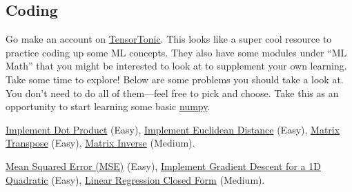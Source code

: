 \documentclass{article}
\newenvironment{envsection}[1]{\begin{trivlist}
\item[\hskip \labelsep {\bfseries #1}]}{\end{trivlist}}
\begin{document}
\subsection*{Coding}

Go make an account on \href{https://www.tensortonic.com/problems}{TensorTonic}. This looks like a super cool resource to practice coding up some ML concepts. They also have some modules under ``ML Math'' that you might be interested to look at to supplement your own learning. Take some time to explore! Below are some problems you should take a look at. You don't need to do all of them---feel free to pick and choose. Take this as an opportunity to start learning some basic \href{https://numpy.org/doc/stable/}{numpy}.

\begin{envsection}{1. Linear Algebra.}
    \href{https://www.tensortonic.com/problems/dot-product}{Implement Dot Product} (Easy), \href{https://www.tensortonic.com/problems/euclidean-distance}{Implement Euclidean Distance} (Easy), \href{https://www.tensortonic.com/problems/matrix-transpose}{Matrix Transpose} (Easy), \href{https://www.tensortonic.com/problems/matrix-inverse}{Matrix Inverse} (Medium).
\end{envsection}

\begin{envsection}{2. Basic ML.}
    \href{https://www.tensortonic.com/problems/mean-squared-error}{Mean Squared Error (MSE)} (Easy), \href{https://www.tensortonic.com/problems/gradient-descent-quadratic}{Implement Gradient Descent for a 1D Quadratic} (Easy), \href{https://www.tensortonic.com/problems/linear-regression-closed-form}{Linear Regression Closed Form} (Medium).
\end{envsection}
\end{document}
